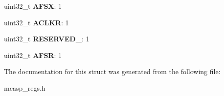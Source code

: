 \begin{DoxyCompactItemize}
\item 
\hypertarget{structMCASP__PDIR_add92834ca8da39387f427bbf95e9472b}{uint32\-\_\-t {\bfseries A\-F\-S\-X}\-: 1}\label{structMCASP__PDIR_add92834ca8da39387f427bbf95e9472b}

\item 
\hypertarget{structMCASP__PDIR_acb406eb89516054944c44854c7345e5f}{uint32\-\_\-t {\bfseries A\-C\-L\-K\-R}\-: 1}\label{structMCASP__PDIR_acb406eb89516054944c44854c7345e5f}

\item 
\hypertarget{structMCASP__PDIR_a4b90ef39a47260e6f914434eb6395c3b}{uint32\-\_\-t {\bfseries R\-E\-S\-E\-R\-V\-E\-D\-\_}\-: 1}\label{structMCASP__PDIR_a4b90ef39a47260e6f914434eb6395c3b}

\item 
\hypertarget{structMCASP__PDIR_a9576ff2a3808a5139a87c0e8517aa136}{uint32\-\_\-t {\bfseries A\-F\-S\-R}\-: 1}\label{structMCASP__PDIR_a9576ff2a3808a5139a87c0e8517aa136}

\end{DoxyCompactItemize}


The documentation for this struct was generated from the following file\-:\begin{DoxyCompactItemize}
\item 
mcasp\-\_\-regs.\-h\end{DoxyCompactItemize}
